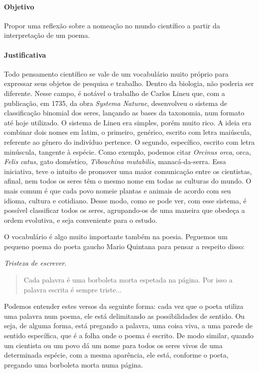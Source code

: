 \documentclass[12pt]{extarticle}
\begin{document}
\paragraph{Objetivo} Propor uma reflexão sobre a nomeação no mundo científico
a partir da interpretação de um poema. 

\paragraph{Justificativa} Todo pensamento científico se vale de um vocabulário muito próprio para
expressar seus objetos de pesquisa e trabalho. Dentro da biologia, não poderia
ser diferente. Nesse campo, é notável o trabalho de Carlos Lineu que, com
a publicação, em 1735, da obra \emph{Systema Naturae}, desenvolveu o sistema de
classificação binomial dos seres, lançando as bases da taxonomia, num formato
até hoje utilizado. O sistema de Lineu era simples, porém muito rico. A ideia
era combinar dois nomes em latim, o primeiro, genérico, escrito com letra
maiúscula, referente ao gênero do indivíduo pertence. O segundo, específico,
escrito com letra minúscula, tangente à espécie. Como exemplo, podemos citar
\emph{Orcinus orca}, orca, \emph{Felis catus}, gato doméstico, \emph{Tibouchina
mutabilis}, manacá-da-serra. Essa iniciativa, teve o intuito de promover uma
maior comunicação entre os cientistas, afinal, nem todos os seres têm o mesmo
nome em todas as culturas do mundo. O mais comum é que cada povo nomeie plantas
e animais de acordo com seu idioma, cultura e cotidiano. Desse modo, como se
pode ver, com esse sistema, é possível classificar todos os seres, agrupando-os
de uma maneira que obedeça a ordem evolutiva, e seja conveniente para o estudo.

O vocabulário é algo muito importante também na poesia. 
Peguemos um pequeno poema do poeta gaucho Mario Quintana para pensar a respeito disso: 

\textit{Tristeza de escrever}.

\begin{verse}
Cada palavra é uma borboleta morta espetada na página.
Por isso a palavra escrita é sempre triste...
\end{verse}

Podemos entender estes versos da seguinte forma: cada vez que o poeta
utiliza uma palavra num poema, ele está delimitando as possibilidades
de sentido. Ou seja, de alguma forma, está pregando a palavra, uma coisa
viva, a uma parede de sentido específica, que é a folha onde o poema é 
escrito. De modo similar, quando um cientista ou um povo dá um nome para todos os 
seres vivos de uma determinada espécie, com a mesma aparência, ele está, conforme
o poeta, pregando uma borboleta morta numa página. 
\end{document}
